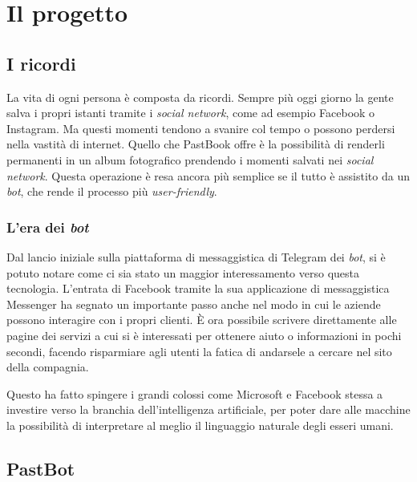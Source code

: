 
\chapter{Il progetto}
\label{cap:progetto}

\section{I ricordi}

La vita di ogni persona è composta da ricordi. Sempre più oggi giorno la gente
salva i propri istanti tramite i \textit{social network}, come ad esempio
Facebook o Instagram. Ma questi momenti tendono a svanire col tempo o possono
perdersi nella vastità di internet. Quello che PastBook offre è la
possibilità di renderli permanenti in un album fotografico prendendo i momenti
salvati nei \textit{social network}. Questa operazione è resa ancora più
semplice se il tutto è assistito da un \textit{bot}, che rende il processo più
\textit{user-friendly}.

\subsection{L'era dei \textit{bot}}

Dal lancio iniziale sulla piattaforma di messaggistica di Telegram dei
\textit{bot}, si è potuto notare come ci sia stato un maggior interessamento
verso questa tecnologia. L'entrata di Facebook tramite la sua applicazione di
messaggistica Messenger ha segnato un importante passo anche nel modo in cui le
aziende possono interagire con i propri clienti. È ora possibile scrivere
direttamente alle pagine dei servizi a cui si è interessati per ottenere aiuto o
informazioni in pochi secondi, facendo risparmiare agli utenti la fatica di
andarsele a cercare nel sito della compagnia.

Questo ha fatto spingere i grandi colossi come Microsoft e Facebook stessa a
investire verso la branchia dell'intelligenza artificiale, per poter dare
alle macchine la possibilità di interpretare al meglio il linguaggio naturale
degli esseri umani.

\section{PastBot}

